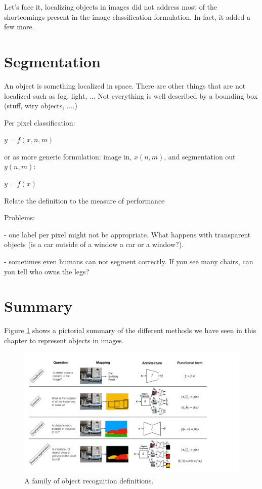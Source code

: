 Let's face it, localizing objects in images did not address most of the shortcomings present in the image classification formulation. In fact, it added a few more.

\section{Segmentation}

An object is something localized in space. There are other things that are not localized such as fog, light, ... Not everything is well described by a bounding box (stuff, wiry objects, ....)

Per pixel classification:

$y = f(x, n, m)$

or as more generic formulation: image in, $x(n,m)$, and segmentation out $y(n,m)$:

$y = f(x)$

Relate the definition to the measure of performance

Problems:

- one label per pixel might not be appropriate. What happens with transparent objects (is a car outside of a window a car or a window?).

- sometimes even humans can not segment correctly. If you see many chairs, can you tell who owns the legs?


\section{Summary}

Figure \ref{fig:pictorialsummary} shows a pictorial summary of the different methods we have seen in this chapter to represent objects in images.

\begin{figure}
	\includegraphics[width=1\linewidth]{figures/object_recognition/model_cards.pdf}
	\caption{A family of object recognition definitions.}
	\label{fig:pictorialsummary}
\end{figure}



